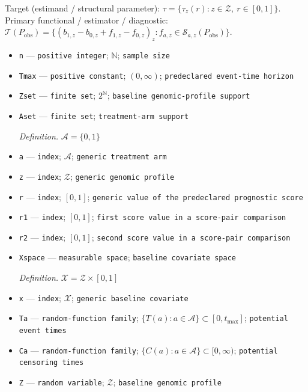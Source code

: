 \documentclass{article}
\begin{document}
Target (estimand / structural parameter): \(\tau=\{\tau_z(r):z\in\mathcal Z,\ r\in[0,1]\}\).
Primary functional / estimator / diagnostic: \(\mathcal T(P_{\mathrm{obs}})=\{(b_{1,z}-b_{0,z}+f_{1,z}-f_{0,z})_z:f_{a,z}\in\mathcal S_{a,z}(P_{\mathrm{obs}})\}\).
\begin{itemize}
  \item \texttt{n} --- \texttt{positive integer}; \(\mathbb N\); \texttt{sample size}
  \item \texttt{Tmax} --- \texttt{positive constant}; \((0,\infty)\); \texttt{predeclared event-\allowbreak{}time horizon}
  \item \texttt{Zset} --- \texttt{finite set}; \(2^{\mathbb N}\); \texttt{baseline genomic-\allowbreak{}profile support}
  \item \texttt{Aset} --- \texttt{finite set}; \texttt{treatment-\allowbreak{}arm support}
  \par\smallskip\noindent\emph{Definition.} \(\mathcal A=\{0,1\}\)
  \item \texttt{a} --- \texttt{index}; \(\mathcal A\); \texttt{generic treatment arm}
  \item \texttt{z} --- \texttt{index}; \(\mathcal Z\); \texttt{generic genomic profile}
  \item \texttt{r} --- \texttt{index}; \([0,1]\); \texttt{generic value of the predeclared prognostic score}
  \item \texttt{r1} --- \texttt{index}; \([0,1]\); \texttt{first score value in a score-\allowbreak{}pair comparison}
  \item \texttt{r2} --- \texttt{index}; \([0,1]\); \texttt{second score value in a score-\allowbreak{}pair comparison}
  \item \texttt{Xspace} --- \texttt{measurable space}; \texttt{baseline covariate space}
  \par\smallskip\noindent\emph{Definition.} \(\mathcal X=\mathcal Z\times[0,1]\)
  \item \texttt{x} --- \texttt{index}; \(\mathcal X\); \texttt{generic baseline covariate}
  \item \texttt{Ta} --- \texttt{random-\allowbreak{}function family}; \(\{T(a):a\in\mathcal A\}\subset[0,t_{\max}]\); \texttt{potential event times}
  \item \texttt{Ca} --- \texttt{random-\allowbreak{}function family}; \(\{C(a):a\in\mathcal A\}\subset[0,\infty)\); \texttt{potential censoring times}
  \item \texttt{Z} --- \texttt{random variable}; \(\mathcal Z\); \texttt{baseline genomic profile}

\end{itemize}
\end{document}
